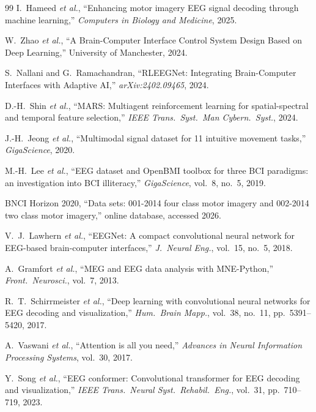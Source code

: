 \documentclass[12pt, a4paper]{article}
\begin{document}
\begin{thebibliography}{99}
I.~Hameed \emph{et al.}, ``Enhancing motor imagery EEG signal decoding through machine learning,'' \textit{Computers in Biology and Medicine}, 2025.

W.~Zhao \emph{et al.}, ``A Brain-Computer Interface Control System Design Based on Deep Learning,'' University of Manchester, 2024.

S.~Nallani and G.~Ramachandran, ``RLEEGNet: Integrating Brain-Computer Interfaces with Adaptive AI,'' \textit{arXiv:2402.09465}, 2024.

D.-H.~Shin \emph{et al.}, ``MARS: Multiagent reinforcement learning for spatial-spectral and temporal feature selection,'' \textit{IEEE Trans.\ Syst.\ Man Cybern.\ Syst.}, 2024.

J.-H.~Jeong \emph{et al.}, ``Multimodal signal dataset for 11 intuitive movement tasks,'' \textit{GigaScience}, 2020.

M.-H.~Lee \emph{et al.}, ``EEG dataset and OpenBMI toolbox for three BCI paradigms: an investigation into BCI illiteracy,'' \textit{GigaScience}, vol.~8, no.~5, 2019.

BNCI Horizon 2020, ``Data sets: 001-2014 four class motor imagery and 002-2014 two class motor imagery,'' online database, accessed 2026.

V.~J.~Lawhern \emph{et al.}, ``EEGNet: A compact convolutional neural network for EEG-based brain-computer interfaces,'' \textit{J.\ Neural Eng.}, vol.~15, no.~5, 2018.

A.~Gramfort \emph{et al.}, ``MEG and EEG data analysis with MNE-Python,'' \textit{Front.\ Neurosci.}, vol.~7, 2013.

R.~T.~Schirrmeister \emph{et al.}, ``Deep learning with convolutional neural networks for EEG decoding and visualization,'' \textit{Hum.\ Brain Mapp.}, vol.~38, no.~11, pp.~5391--5420, 2017.

A.~Vaswani \emph{et al.}, ``Attention is all you need,'' \textit{Advances in Neural Information Processing Systems}, vol.~30, 2017.

Y.~Song \emph{et al.}, ``EEG conformer: Convolutional transformer for EEG decoding and visualization,'' \textit{IEEE Trans.\ Neural Syst.\ Rehabil.\ Eng.}, vol.~31, pp.~710--719, 2023.


\end{thebibliography}
\end{document}
